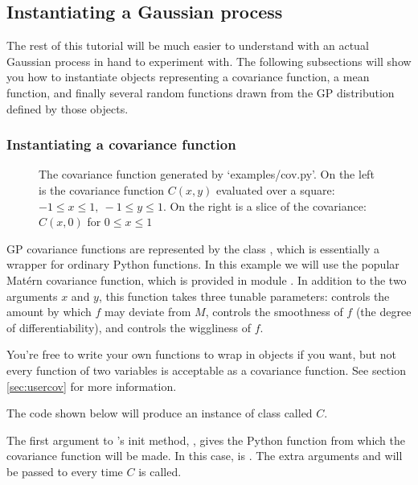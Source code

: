 \documentclass{manual}
\begin{document}
\subsection{Instantiating a Gaussian process}\label{sub:inst}

The rest of this tutorial will be much easier to understand with an actual Gaussian process in hand to experiment with. The following subsections will show you how to instantiate objects representing a covariance function, a mean function, and finally several random functions drawn from the GP distribution defined by those objects.

\subsubsection{Instantiating a covariance function}\label{subsub:cov}
\begin{figure}
	\centering
	\caption{The covariance function generated by {\sffamily `examples/cov.py'}. On the left is the covariance function $C(x,y)$ evaluated over a square: $-1\le x\le 1,\ -1\le y\le 1$. On the right is a slice of the covariance: $C(x,0)$ for $0\le x \le 1$}
	\label{fig:cov}
\end{figure}

GP covariance functions are represented by the class , which is essentially a wrapper for ordinary Python functions. In this example we will use the popular Mat\'ern covariance function, which is provided in module . In addition to the two arguments $x$ and $y$, this function takes three tunable parameters:  controls the amount by which $f$ may deviate from $M$,  controls the smoothness of $f$ (the degree of differentiability), and  controls the wiggliness of $f$.

You're free to write your own functions to wrap in  objects if you want, but not every function of two variables is acceptable as a covariance function. See section \ref{sec:usercov} for more information.

The code shown below will produce an instance of class  called $C$.


The first argument to 's init method, , gives the Python function from which the covariance function will be made. In this case,  is . The extra arguments  and  will be passed to  every time $C$ is called.
\end{document}

